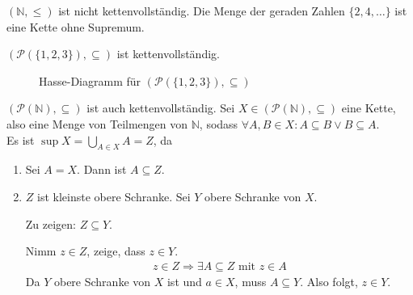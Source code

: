 \par\medskip
\begin{example}
    $(\mathbb{N}, \leq)$ ist nicht kettenvollständig. Die Menge der geraden Zahlen $\{ 2, 4, \dots \}$ ist eine Kette ohne Supremum.

    \par\medskip
    $(\mathcal{P}(\{ 1, 2, 3 \}), \subseteq)$ ist kettenvollständig.
    \begin{figure}[H]
        \centering
        \caption{Hasse-Diagramm für $(\mathcal{P}(\{1,2,3\}), \subseteq)$}
    \end{figure}

    \par\medskip
    $(\mathcal{P}(\mathbb{N}), \subseteq)$ ist auch kettenvollständig. Sei $X \in (\mathcal{P}(\mathbb{N}), \subseteq)$ eine Kette, also eine Menge von Teilmengen von $\mathbb{N}$, sodass $\forall A, B \in X: A \subseteq B \vee B \subseteq A$.\\
    Es ist $\sup X = \bigcup_{A \in X} A = Z$, da \begin{enumerate}
        \item Sei $A = X$. Dann ist $A \subseteq Z$.
        \item $Z$ ist kleinste obere Schranke. Sei $Y$ obere Schranke von $X$.

            Zu zeigen: $Z \subseteq Y$.

            Nimm $z \in Z$, zeige, dass $z \in Y$.
            \begin{align*}
                z \in Z \Rightarrow \exists A \subseteq Z \text{ mit } z \in A
            \end{align*}
            Da $Y$ obere Schranke von $X$ ist und $a \in X$, muss $A \subseteq Y$. Also folgt, $z \in Y$.
    \end{enumerate}
\end{example}

